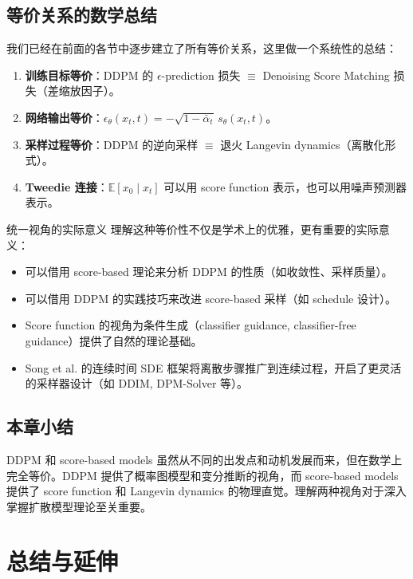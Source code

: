 \documentclass[a4paper]{article}
\begin{document}
\subsection{等价关系的数学总结}

我们已经在前面的各节中逐步建立了所有等价关系，这里做一个系统性的总结：

\begin{enumerate}
    \item \textbf{训练目标等价}：DDPM 的 $\epsilon$-prediction 损失 $\equiv$ Denoising Score Matching 损失（差缩放因子）。
    \item \textbf{网络输出等价}：$\epsilon_\theta(x_t, t) = -\sqrt{1-\bar{\alpha}_t}\, s_\theta(x_t, t)$。
    \item \textbf{采样过程等价}：DDPM 的逆向采样 $\equiv$ 退火 Langevin dynamics（离散化形式）。
    \item \textbf{Tweedie 连接}：$\mathbb{E}[x_0 \mid x_t]$ 可以用 score function 表示，也可以用噪声预测器表示。
\end{enumerate}

\begin{importantbox}{统一视角的实际意义}
理解这种等价性不仅是学术上的优雅，更有重要的实际意义：
\begin{itemize}
    \item 可以借用 score-based 理论来分析 DDPM 的性质（如收敛性、采样质量）。
    \item 可以借用 DDPM 的实践技巧来改进 score-based 采样（如 schedule 设计）。
    \item Score function 的视角为条件生成（classifier guidance, classifier-free guidance）提供了自然的理论基础。
    \item Song et al. 的连续时间 SDE 框架将离散步骤推广到连续过程，开启了更灵活的采样器设计（如 DDIM, DPM-Solver 等）。
\end{itemize}
\end{importantbox}

\subsection{本章小结}

DDPM 和 score-based models 虽然从不同的出发点和动机发展而来，但在数学上完全等价。DDPM 提供了概率图模型和变分推断的视角，而 score-based models 提供了 score function 和 Langevin dynamics 的物理直觉。理解两种视角对于深入掌握扩散模型理论至关重要。

\section{总结与延伸}
\end{document}
